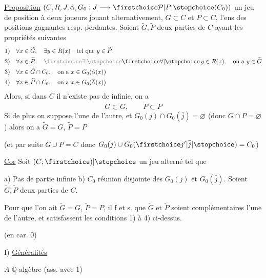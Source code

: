 \uline{Proposition}  $(C,R,J,\hat\alpha,G_0:J\longrightarrow\unsure{\mathcal P|P}(C_0))$ un jeu de position à deux joueurs jouant alternativement, $G\subset C$ et $P\subset C$, l'ens des positions gagnantes resp. perdantes. Soient $\widetilde G,\widetilde P$ deux parties de $C$ ayant les propriétés suivantes
\[
\begin{aligned}
1)\quad&\forall x\in\widetilde G,\quad\exists y\in R(x)\quad\text{tel que }y\in\widetilde P\\
2)\quad&\forall x\in\widetilde P,\quad\deleted{\unsure{\exists}}\unsure{\forall}\,y\in R(x),\quad\text{on a }y\in\widetilde G\\
3)\quad&\forall x\in\widetilde G\cap C_0,\quad\text{on a }x\in G_0(\hat\alpha(x))\\
4)\quad&\forall x\in\widetilde P\cap C_0,\quad\text{on a }x\in G_0(\overline{\hat\alpha}(x))
\end{aligned}
\]
Alors, si dans $C$ il n'existe pas de   infinie, on a
\[
\widetilde G\subset G,\qquad\widetilde P\subset P
\]
Si de plus on suppose   l'une de l'autre,  et $G_0(j)\cap G_0(\bar j)=\varnothing$ (donc $G\cap P=\varnothing$) alors on a $\widetilde G=G$, $\widetilde P=P$

(et par suite $G\cup P=C$ donc $G_0(j)\cup G_0(\unsure{j'|\bar j})=C_0$)

\uline{Cor} Soit $(C;\unsure{)}$ un jeu alterné tel que 

a) Pas de partie infinie \quad b) $C_0$ réunion disjointe des $G_0(j)$ et $G_0(\bar j)$. Soient $\widetilde G,\widetilde P$ deux parties de $C$.

Pour que l'on ait $\widetilde G=G$, $\widetilde P=P$, il f et s. que $\widetilde G$ et $\widetilde P$ soient complémentaires l'une de l'autre, et satisfassent les conditions 1) à 4) ci-dessus.

\uline{} (en car. 0)

I) \uline{Généralités}

$A$ $\mathbb{Q}$-algèbre (ass. avec 1)

